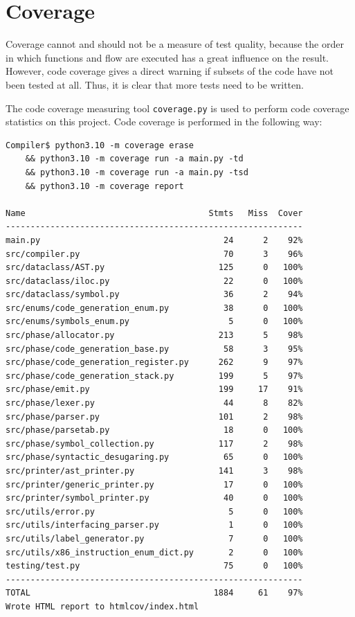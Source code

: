 \section{Coverage}
Coverage cannot and should not be a measure of test quality, because the order in which functions and flow are executed has a great influence on the result. However, code coverage gives a direct warning if subsets of the code have not been tested at all. Thus, it is clear that more tests need to be written.

The code coverage measuring tool \texttt{coverage.py} is used to perform code coverage statistics on this project. Code coverage is performed in the following way:

\begin{verbatim}
Compiler$ python3.10 -m coverage erase
    && python3.10 -m coverage run -a main.py -td
    && python3.10 -m coverage run -a main.py -tsd 
    && python3.10 -m coverage report 

Name                                     Stmts   Miss  Cover
------------------------------------------------------------
main.py                                     24      2    92%
src/compiler.py                             70      3    96%
src/dataclass/AST.py                       125      0   100%
src/dataclass/iloc.py                       22      0   100%
src/dataclass/symbol.py                     36      2    94%
src/enums/code_generation_enum.py           38      0   100%
src/enums/symbols_enum.py                    5      0   100%
src/phase/allocator.py                     213      5    98%
src/phase/code_generation_base.py           58      3    95%
src/phase/code_generation_register.py      262      9    97%
src/phase/code_generation_stack.py         199      5    97%
src/phase/emit.py                          199     17    91%
src/phase/lexer.py                          44      8    82%
src/phase/parser.py                        101      2    98%
src/phase/parsetab.py                       18      0   100%
src/phase/symbol_collection.py             117      2    98%
src/phase/syntactic_desugaring.py           65      0   100%
src/printer/ast_printer.py                 141      3    98%
src/printer/generic_printer.py              17      0   100%
src/printer/symbol_printer.py               40      0   100%
src/utils/error.py                           5      0   100%
src/utils/interfacing_parser.py              1      0   100%
src/utils/label_generator.py                 7      0   100%
src/utils/x86_instruction_enum_dict.py       2      0   100%
testing/test.py                             75      0   100%
------------------------------------------------------------
TOTAL                                     1884     61    97%
Wrote HTML report to htmlcov/index.html
\end{verbatim}

